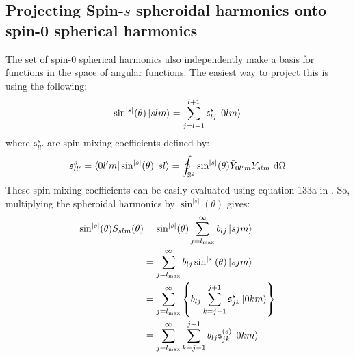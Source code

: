 \documentclass[preprint,showpacs,preprintnumbers,amssymb,superscriptaddress,aps,prd,nofootinbib,11pt]{revtex4-1}
\begin{document}
\subsection{Projecting Spin-$s$ spheroidal harmonics onto spin-0 spherical harmonics}
The set of spin-0 spherical harmonics also independently make a basis for functions in the space of angular functions. The easiest way to project this is using the following:
\begin{equation}
    \sin^{|s|}(\theta) \ket{s l m} = \sum\limits_{j=l-1}^{l+1} \mathfrak{s}^s_{lj} \ket{0 l m}
\end{equation}
where $\mathfrak{s}^s_{ll'}$ are spin-mixing coefficients defined by:
\begin{equation}
    \mathfrak{s}^s_{ll'} = \bra{0 l' m} \sin^{|s|}(\theta) \ket{s l} = \oint_{\mathbb{S}^2} \sin^{|s|}(\theta) \bar{Y}_{0l'm} Y_{slm} \ \dd \Omega
\end{equation}
These spin-mixing coefficients can be easily evaluated using equation 133a in \cite{dolan2023metric}. So, multiplying the spheroidal harmonics by $\sin^{|s|}(\theta)$ gives:
\begin{align}
    \sin^{|s|}(\theta) S_{slm}(\theta) &= \sin^{|s|}(\theta) \sum\limits_{j = l_\text{max}}^\infty b_{lj}\ket{s j m}\\
    &= \sum\limits_{j = l_\text{max}}^\infty b_{lj} \sin^{|s|}(\theta)\ket{s j m}\\
    &= \sum\limits_{j = l_\text{max}}^\infty \left\{b_{lj}\sum\limits_{k=j-1}^{j+1} \mathfrak{s}^s_{jk} \ket{0 k m} \right\}\\
    &=\sum\limits_{j = l_\text{max}}^\infty \sum\limits_{k=j-1}^{j+1}  b_{lj} \mathfrak{s}^{(s)}_{jk} \ket{0km}
\end{align}


\end{document}
